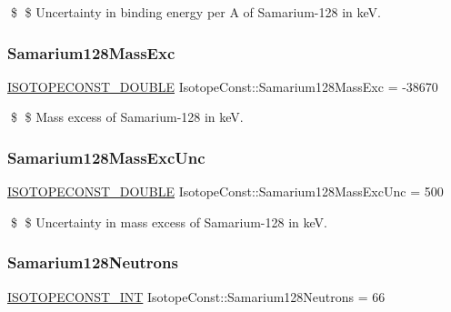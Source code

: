 \$ \$ Uncertainty in binding energy per A of Samarium-\/128 in keV. \mbox{\label{group___isotope_const-_samarium-_sm128_ga515589ed68ae281d56b41bf3b1f08271}} 
\subsubsection{\texorpdfstring{Samarium128\+Mass\+Exc}{Samarium128MassExc}}
{\footnotesize\ttfamily \mbox{\hyperlink{group___isotope_const-_macros_ga8f45a7272ce02c0b4c65c44636ed719a}{I\+S\+O\+T\+O\+P\+E\+C\+O\+N\+S\+T\+\_\+\+D\+O\+U\+B\+LE}} Isotope\+Const\+::\+Samarium128\+Mass\+Exc = -\/38670}

\$ \$ Mass excess of Samarium-\/128 in keV. \mbox{\label{group___isotope_const-_samarium-_sm128_ga11194ef5f71b3f4726ed533ec18ef3cb}} 
\subsubsection{\texorpdfstring{Samarium128\+Mass\+Exc\+Unc}{Samarium128MassExcUnc}}
{\footnotesize\ttfamily \mbox{\hyperlink{group___isotope_const-_macros_ga8f45a7272ce02c0b4c65c44636ed719a}{I\+S\+O\+T\+O\+P\+E\+C\+O\+N\+S\+T\+\_\+\+D\+O\+U\+B\+LE}} Isotope\+Const\+::\+Samarium128\+Mass\+Exc\+Unc = 500}

\$ \$ Uncertainty in mass excess of Samarium-\/128 in keV. \mbox{\label{group___isotope_const-_samarium-_sm128_gafc7786092a073c85960a887ce3585ab3}} 
\subsubsection{\texorpdfstring{Samarium128\+Neutrons}{Samarium128Neutrons}}
{\footnotesize\ttfamily \mbox{\hyperlink{group___isotope_const-_macros_ga5f18360b3e99483a35c32d789e62621c}{I\+S\+O\+T\+O\+P\+E\+C\+O\+N\+S\+T\+\_\+\+I\+NT}} Isotope\+Const\+::\+Samarium128\+Neutrons = 66}

